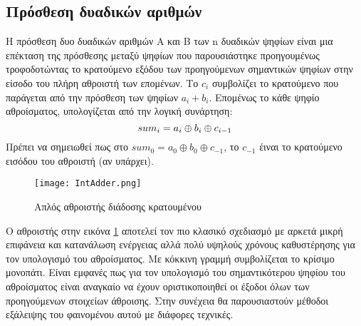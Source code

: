 % 
\subsection{Πρόσθεση δυαδικών αριθμών}

Η πρόσθεση δυο δυαδικών αριθμών A και Β των n δυαδικών ψηφίων είναι 
μια επέκταση της πρόσθεσης μεταξύ ψηφίων που παρουσιάστηκε προηγουμένως τροφοδοτώντας 
το κρατούμενο εξόδου των προηγούμενων σημαντικών ψηφίων στην είσοδο του πλήρη αθροιστή 
των επομένων. Το $c_{i}$ συμβολίζει το κρατούμενο που παράγεται από την πρόσθεση των ψηφίων 
$a_i+b_i$. Επομένως το κάθε ψηφίο αθροίσματος, υπολογίζεται από την 
λογική συνάρτηση:
\begin{equation}
    sum_i = a_i \oplus b_i \oplus c_{i-1}\\
\end{equation}
Πρέπει να σημειωθεί πως στο $sum_0 = a_0 \oplus b_0 \oplus c_{-1}$, το $c_{-1}$ έιναι το κρατούμενο εισόδου του αθροιστή (αν υπάρχει).
\begin{figure}[H]
    \centering
    \texttt{[image: IntAdder.png]}
    \caption{Απλός αθροιστής διάδοσης κρατουμένου}
    \label{IntegerAdderSchematic}
\end{figure}
Ο αθροιστής στην εικόνα \ref{IntegerAdderSchematic} αποτελεί τον πιο κλασικό σχεδιασμό 
με αρκετά μικρή επιφάνεια και κατανάλωση ενέργειας αλλά πολύ υψηλούς χρόνους καθυστέρησης 
για τον υπολογισμό του αθροίσματος. Με κόκκινη γραμμή συμβολίζεται το κρίσιμο μονοπάτι. Είναι εμφανές πως για τον υπολογισμό του σημαντικότερου ψηφίου του αθροίσματος είναι αναγκαίο να έχουν οριστικοποιηθεί οι έξοδοι όλων των προηγούμενων στοιχείων άθροισης. Στην συνέχεια θα παρουσιαστούν μέθοδοι εξάλειψης του φαινομένου αυτού με διάφορες τεχνικές.




